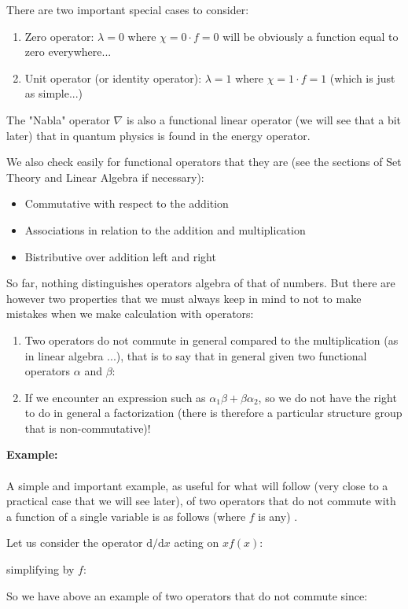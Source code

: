 	There are two important special cases to consider:
	\begin{enumerate}
		\item Zero operator: $\lambda=0$ where $\chi=0\cdot f=0$ will be obviously a function equal to zero everywhere...

		\item Unit operator (or identity operator): $\lambda=1$ where $\chi=1\cdot f=1$ (which is just as simple...)
	\end{enumerate}
	\begin{tcolorbox}[title=Remark,colframe=black,arc=10pt]
	The "Nabla" operator $\nabla$ is also a functional linear operator (we will see that a bit later) that in quantum physics is found in the energy operator.
	\end{tcolorbox}
	We also check easily for functional operators that they are (see the sections of Set Theory and Linear Algebra if necessary):
	\begin{itemize}
		\item Commutative with respect to the addition
	
		\item Associations in relation to the addition and multiplication
		
		\item Bistributive over addition left and right
	\end{itemize}
	So far, nothing distinguishes operators algebra of that of numbers. But there are however two properties that we must always keep in mind to not to make mistakes when we make calculation with operators:
	\begin{enumerate}
		\item Two operators do not commute in general compared to the multiplication (as in linear algebra ...), that is to say that in general given two functional operators $\alpha$ and $\beta$:
		

		\item If we encounter an expression such as $\alpha_1\beta+\beta\alpha_2$, so we do not have the right to do in general a factorization (there is therefore a particular structure group that is non-commutative)!
	\end{enumerate}
	\begin{tcolorbox}[colframe=black,colback=white,sharp corners]
	\textbf{{\Large {}}Example:}\\\\
	A simple and important example, as useful for what will follow (very close to a practical case that we will see later), of two operators that do not commute with a function of a single variable is as follows (where $f$ is any) . 

	Let us consider the operator $\mathrm{d}/\mathrm{d}x$ acting on $xf(x)$:
	
	simplifying by $f$:
	
	So we have above an example of two operators that do not commute since:
	
	\end{tcolorbox}
